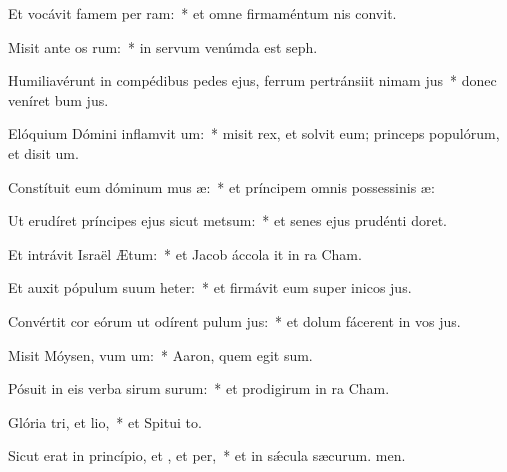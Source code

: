 \item Et vocávit famem per ram:~* et omne firmaméntum nis convit.
\item Misit ante os rum:~* in servum venúmda est seph.
\item Humiliavérunt in compédibus pedes ejus, ferrum pertránsiit nimam jus~* donec veníret bum jus.
\item Elóquium Dómini inflamvit um:~* misit rex, et solvit eum; princeps populórum, et disit um.
\item Constítuit eum dóminum mus æ:~* et príncipem omnis possessinis æ:
\item Ut erudíret príncipes ejus sicut metsum:~* et senes ejus prudénti doret.
\item Et intrávit Israël  Ætum:~* et Jacob áccola it in ra Cham.
\item Et auxit pópulum suum heter:~* et firmávit eum super inicos jus.
\item Convértit cor eórum ut odírent pulum jus:~* et dolum fácerent in vos jus.
\item Misit Móysen, vum um:~* Aaron, quem egit sum.
\item Pósuit in eis verba sirum surum:~* et prodigirum in ra Cham.
\item Glória tri, et lio,~* et Spitui to.
\item Sicut erat in princípio, et , et per,~* et in sǽcula sæcurum. men.
